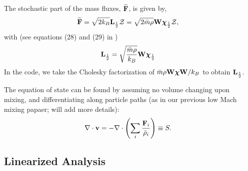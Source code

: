 \documentclass[final]{siamltex}
\def\Fb {{\bf F}}
\def\Lb {{\bf L}}
\def\vb {{\bf v}}
\def\Wb {{\bf W}}
\def\chib   {\boldsymbol{\chi}}
\def\half   {\frac{1}{2}}
\begin{document}
The stochastic part of the mass fluxes, $\widetilde{\Fb}$, is given by,
\begin{equation}
\widetilde{\Fb} = \sqrt{2k_B}\Lb_{\half}\mathcal{Z} = \sqrt{2\bar{m}\rho}\Wb\chib_{\half}\mathcal{Z},
\end{equation}
with (see equations (28) and (29) in \cite{LowMachMulti})
\begin{equation}
\Lb_{\half} = \sqrt{\frac{\bar{m}\rho}{k_B}}\Wb\chib_{\half}
\end{equation}
In the code, we take the Cholesky factorization of $\bar{m}\rho\Wb\chib\Wb/k_B$
to obtain $\Lb_{\half}$.

The equation of state can be found by assuming no volume changing upon mixing,
and differentiating along particle paths (as in our previous low Mach mixing
papaer; will add more details):
\begin{equation}
\nabla\cdot\vb = -\nabla\cdot\left(\sum_i\frac{\Fb_i}{\bar\rho_i}\right) \equiv S\label{eq:S}.
\end{equation}

\subsection{Linearized Analysis}

\clearpage
\end{document}
